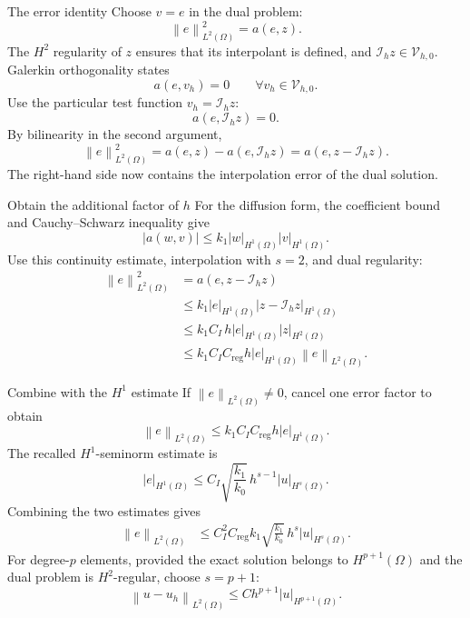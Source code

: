 \documentclass[11pt,aspectratio=169]{beamer}
\newcommand{\Om}{\Omega}
\newcommand{\Vhzero}{\mathcal V_{h,0}}
\newcommand{\Ih}{\mathcal I_h}
\newcommand{\norm}[2][]{\left\lVert#2\right\rVert_{#1}}
\newcommand{\seminorm}[2][]{\left\lvert#2\right\rvert_{#1}}
\begin{document}
\begin{frame}{The error identity}
Choose $v=e$ in the dual problem:
\[
  \norm[L^2(\Om)]{e}^{2}=a(e,z).
\]
The $H^2$ regularity of $z$ ensures that its interpolant is defined, and
$\Ih z\in\Vhzero$. Galerkin orthogonality states
\[
  a(e,v_h)=0\qquad\forall v_h\in\Vhzero.
\]
Use the particular test function $v_h=\Ih z$:
\[
  a(e,\Ih z)=0.
\]
By bilinearity in the second argument,
\[
  \boxed{\norm[L^2(\Om)]{e}^{2}
  =a(e,z)-a(e,\Ih z)
  =a(e,z-\Ih z).}
\]
The right-hand side now contains the interpolation error of the dual
solution.
\end{frame}

\begin{frame}{Obtain the additional factor of \texorpdfstring{$h$}{h}}
For the diffusion form, the coefficient bound and Cauchy--Schwarz inequality
give
\[
  |a(w,v)|
  \leq k_1\seminorm[H^1(\Om)]{w}
  \seminorm[H^1(\Om)]{v}.
\]
Use this continuity estimate, interpolation with $s=2$, and dual regularity:
\begin{align*}
  \norm[L^2(\Om)]{e}^{2}
  &=a(e,z-\Ih z)\\
  &\leq k_1\seminorm[H^1(\Om)]{e}
       \seminorm[H^1(\Om)]{z-\Ih z}\\
  &\leq k_1C_I\,h\seminorm[H^1(\Om)]{e}
       \seminorm[H^2(\Om)]{z}\\
  &\leq k_1C_IC_{\mathrm{reg}}h\seminorm[H^1(\Om)]{e}
       \norm[L^2(\Om)]{e}.
\end{align*}
\end{frame}

\begin{frame}{Combine with the \texorpdfstring{$H^1$}{H1} estimate}
If $\norm[L^2(\Om)]{e}\ne0$, cancel one error factor to obtain
\[
  \norm[L^2(\Om)]{e}
  \leq k_1C_IC_{\mathrm{reg}}h
  \seminorm[H^1(\Om)]{e}.
\]
The recalled $H^1$-seminorm estimate is
\[
  \seminorm[H^1(\Om)]{e}
  \leq C_I\sqrt{\frac{k_1}{k_0}}\,
  h^{s-1}\seminorm[H^s(\Om)]{u}.
\]
Combining the two estimates gives
\begin{align*}
  \norm[L^2(\Om)]{e}
  &\leq C_I^2C_{\mathrm{reg}}k_1
  \sqrt{\frac{k_1}{k_0}}\,
  h^s\seminorm[H^s(\Om)]{u}.
\end{align*}
For degree-$p$ elements, provided the exact solution belongs to
$H^{p+1}(\Om)$ and the dual problem is $H^2$-regular, choose $s=p+1$:
\[
  \boxed{\norm[L^2(\Om)]{u-u_h}\leq
  C h^{p+1}\seminorm[H^{p+1}(\Om)]{u}.}
\]
\end{frame}
\end{document}
